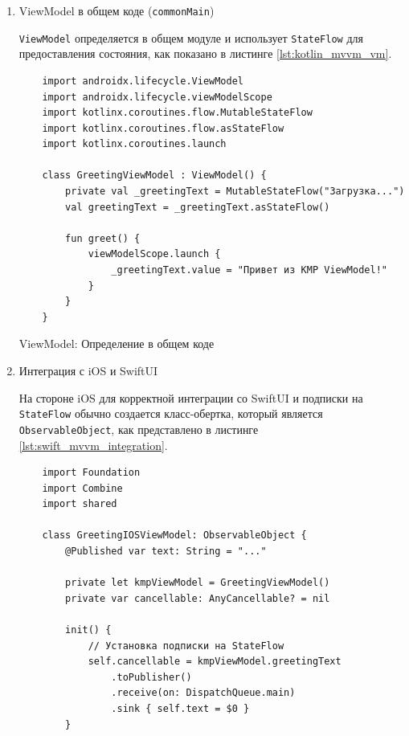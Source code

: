 \documentclass[14pt, russian]{scrartcl}
\begin{document}
\begin{enumerate}
    \item ViewModel в общем коде (\texttt{commonMain})

    \texttt{ViewModel} определяется в общем модуле и использует \texttt{StateFlow} для предоставления состояния, как показано в листинге \ref{lst:kotlin_mvvm_vm}.

    \begin{listing}[H]
    \begin{verbatim}
    import androidx.lifecycle.ViewModel
    import androidx.lifecycle.viewModelScope
    import kotlinx.coroutines.flow.MutableStateFlow
    import kotlinx.coroutines.flow.asStateFlow
    import kotlinx.coroutines.launch

    class GreetingViewModel : ViewModel() {
        private val _greetingText = MutableStateFlow("Загрузка...")
        val greetingText = _greetingText.asStateFlow()

        fun greet() {
            viewModelScope.launch {
                _greetingText.value = "Привет из KMP ViewModel!"
            }
        }
    }
    \end{verbatim}
    \caption{ViewModel: Определение в общем коде}
    \label{lst:kotlin_mvvm_vm}
    \end{listing}

    \item Интеграция с iOS и SwiftUI

    На стороне iOS для корректной интеграции со SwiftUI и подписки на \texttt{StateFlow} обычно создается класс-обертка, который является \texttt{ObservableObject}, как представлено в листинге \ref{lst:swift_mvvm_integration}.

    \begin{listing}[H]
    \begin{verbatim}
    import Foundation
    import Combine
    import shared

    class GreetingIOSViewModel: ObservableObject {
        @Published var text: String = "..."

        private let kmpViewModel = GreetingViewModel()
        private var cancellable: AnyCancellable? = nil

        init() {
            // Установка подписки на StateFlow
            self.cancellable = kmpViewModel.greetingText
                .toPublisher()
                .receive(on: DispatchQueue.main)
                .sink { self.text = $0 }
        }


\end{verbatim}
\end{listing}
\end{enumerate}
\end{document}
